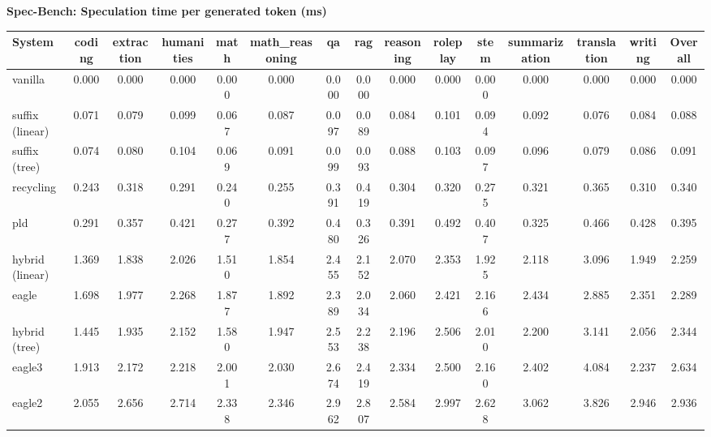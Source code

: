\textbf{Spec-Bench: Speculation time per generated token (ms)}
\begin{table}[H]
\begin{adjustbox}{width=\linewidth}
\centering
\begin{tabular}{lcccccccccccccc}
\toprule
\textbf{System} & coding & extraction & humanities & math & math\_reasoning & qa & rag & reasoning & roleplay & stem & summarization & translation & writing & \textbf{Overall} \\
\midrule
vanilla & 0.000 & 0.000 & 0.000 & 0.000 & 0.000 & 0.000 & 0.000 & 0.000 & 0.000 & 0.000 & 0.000 & 0.000 & 0.000 & 0.000 \\
suffix (linear) & 0.071 & 0.079 & 0.099 & 0.067 & 0.087 & 0.097 & 0.089 & 0.084 & 0.101 & 0.094 & 0.092 & 0.076 & 0.084 & 0.088 \\
suffix (tree) & 0.074 & 0.080 & 0.104 & 0.069 & 0.091 & 0.099 & 0.093 & 0.088 & 0.103 & 0.097 & 0.096 & 0.079 & 0.086 & 0.091 \\
recycling & 0.243 & 0.318 & 0.291 & 0.240 & 0.255 & 0.391 & 0.419 & 0.304 & 0.320 & 0.275 & 0.321 & 0.365 & 0.310 & 0.340 \\
pld & 0.291 & 0.357 & 0.421 & 0.277 & 0.392 & 0.480 & 0.326 & 0.391 & 0.492 & 0.407 & 0.325 & 0.466 & 0.428 & 0.395 \\
hybrid (linear) & 1.369 & 1.838 & 2.026 & 1.510 & 1.854 & 2.455 & 2.152 & 2.070 & 2.353 & 1.925 & 2.118 & 3.096 & 1.949 & 2.259 \\
eagle & 1.698 & 1.977 & 2.268 & 1.877 & 1.892 & 2.389 & 2.034 & 2.060 & 2.421 & 2.166 & 2.434 & 2.885 & 2.351 & 2.289 \\
hybrid (tree) & 1.445 & 1.935 & 2.152 & 1.580 & 1.947 & 2.553 & 2.238 & 2.196 & 2.506 & 2.010 & 2.200 & 3.141 & 2.056 & 2.344 \\
eagle3 & 1.913 & 2.172 & 2.218 & 2.001 & 2.030 & 2.674 & 2.419 & 2.334 & 2.500 & 2.160 & 2.402 & 4.084 & 2.237 & 2.634 \\
eagle2 & 2.055 & 2.656 & 2.714 & 2.338 & 2.346 & 2.962 & 2.807 & 2.584 & 2.997 & 2.628 & 3.062 & 3.826 & 2.946 & 2.936 \\
\bottomrule
\end{tabular}
\end{adjustbox}
\end{table}

